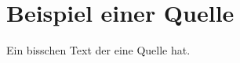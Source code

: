\chapter{Beispiel einer Quelle}

Ein bisschen Text der eine Quelle hat. \cite{1}
\cleardoubleemptypage %